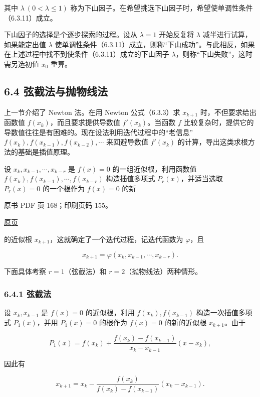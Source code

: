 其中 \(\lambda\ (0<\lambda\leqslant1)\) 称为下山因子。在希望挑选下山因子时，希望使单调性条件（6.3.11）成立。

下山因子的选择是个逐步探索的过程。设从 \(\lambda=1\) 开始反复将 \(\lambda\) 减半进行试算，如果能定出值 \(\lambda\) 使单调性条件（6.3.11）成立，则称``下山成功''。与此相反，如果在上述过程中找不到使条件（6.3.11）成立的下山因子 \(\lambda\)，则称``下山失败''，这时需另选初值 \(x_0\) 重算。

\subsection{6.4 弦截法与抛物线法}\label{ch06-ux5f26ux622aux6cd5ux4e0eux629bux7269ux7ebfux6cd5}

上一节介绍了 Newton 法。在用 Newton 公式（6.3.3）求 \(x_{k+1}\) 时，不但要求给出函数值 \(f(x_k)\)，而且要求提供导数值 \(f'(x_k)\)。当函数 \(f\) 比较复杂时，提供它的导数值往往是有困难的。现在设法利用迭代过程中的``老信息''\(f(x_k),f(x_{k-1}),f(x_{k-2}),\cdots\) 来回避导数值 \(f'(x_k)\) 的计算，导出这类求根方法的基础是插值原理。

设 \(x_k,x_{k-1},\cdots,x_{k-r}\) 是 \(f(x)=0\) 的一组近似根，利用函数值 \(f(x_k),f(x_{k-1}),\cdots,f(x_{k-r})\) 构造插值多项式 \(P_r(x)\)，并适当选取 \(P_r(x)=0\) 的一个根作为 \(f(x)=0\) 的新

\clearpage

原书 PDF 页 168；印刷页码 155。

\href{source-images/pdf-168.jpeg}{原页}

的近似根 \(x_{k+1}\)，这就确定了一个迭代过程，记迭代函数为 \(\varphi\)，且

\[
x_{k+1}=\varphi(x_k,x_{k-1},\cdots,x_{k-r}).
\]

下面具体考察 \(r=1\)（弦截法）和 \(r=2\)（抛物线法）两种情形。

\subsubsection{6.4.1 弦截法}\label{ch06-ux5f26ux622aux6cd5}

设 \(x_k,x_{k-1}\) 是 \(f(x)=0\) 的近似根，利用 \(f(x_k),f(x_{k-1})\) 构造一次插值多项式 \(P_1(x)\)，并用 \(P_1(x)=0\) 的根作为 \(f(x)=0\) 的新的近似根 \(x_{k+1}\)。由于

\[
P_1(x)=f(x_k)+\frac{f(x_k)-f(x_{k-1})}{x_k-x_{k-1}}(x-x_k),
\tag{6.4.1}
\]

因此有

\[
x_{k+1}=x_k-\frac{f(x_k)}{f(x_k)-f(x_{k-1})}(x_k-x_{k-1}).
\tag{6.4.2}
\]

